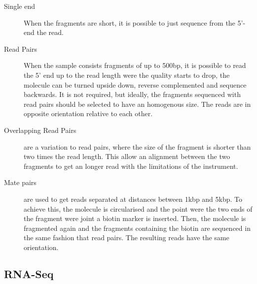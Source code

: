 \begin{description}
\item[Single end] When the fragments are short, it is possible to just sequence from the 5'-end the read.
\item[Read Pairs] When the sample consists fragments of up to 500bp, it is possible to read the 5' end up to the read length were the quality starts to drop, the molecule can be turned upside down, reverse complemented and sequence backwards. It is not required, but ideally, the fragments sequenced with read pairs should be selected to have an homogenous size. The reads are in opposite orientation relative to each other. 
\item[Overlapping Read Pairs] are a variation to read pairs, where the size of the fragment is shorter than two times the read length. This allow an alignment between the two fragments to get an longer read with the limitations of the instrument.
\item[Mate pairs]  are used to get reads separated at distances between 1kbp and 5kbp. To achieve this, the molecule is circularised and the point were the two ends of the fragment were joint a biotin marker is inserted. Then, the molecule is fragmented again and the fragments containing the biotin are sequenced in the same fashion that read pairs. The resulting reads have the same orientation.
\end{description}


\subsection{RNA-Seq}
\label{lit:rna-seq}


